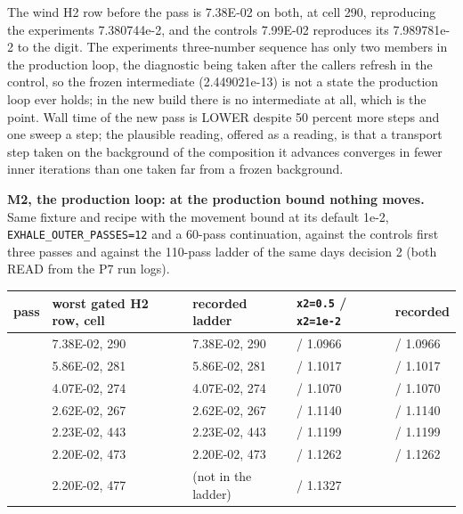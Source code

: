 \documentclass[english,a4paper]{my_memo}
\begin{document}
The wind H2 row before the pass is 7.38E-02 on both, at cell 290, reproducing
the experiment\textquotesingle s 7.380744e-2, and the control\textquotesingle s 7.99E-02 reproduces its
7.989781e-2 to the digit. The experiment\textquotesingle s three-number sequence has only two
members in the production loop, the diagnostic being taken after the caller\textquotesingle s
refresh in the control, so the frozen intermediate (2.449021e-13) is not a state
the production loop ever holds; in the new build there is no intermediate at
all, which is the point. Wall time of the new pass is LOWER despite 50 percent
more steps and one sweep a step; the plausible reading, offered as a reading, is
that a transport step taken on the background of the composition it advances
converges in fewer inner iterations than one taken far from a frozen
background.

\textbf{M2, the production loop: at the production bound nothing moves.} Same
fixture and recipe with the movement bound at its default 1e-2,
\texttt{EXHALE\_OUTER\_PASSES=12} and a 60-pass continuation, against the control\textquotesingle s first
three passes and against the 110-pass ladder of the same day\textquotesingle s decision 2 (both
READ from the P7 run logs).

{\def\LTcaptype{none} %
{\small
\begin{longtable}[]{@{}>{\raggedright\arraybackslash}p{\dimexpr(\linewidth-10\tabcolsep)/5\relax}>{\raggedright\arraybackslash}p{\dimexpr(\linewidth-10\tabcolsep)/5\relax}>{\raggedright\arraybackslash}p{\dimexpr(\linewidth-10\tabcolsep)/5\relax}>{\raggedright\arraybackslash}p{\dimexpr(\linewidth-10\tabcolsep)/5\relax}>{\raggedright\arraybackslash}p{\dimexpr(\linewidth-10\tabcolsep)/5\relax}@{}}
\toprule\noalign{}
pass & worst gated H2 row, cell & recorded ladder & \texttt{x2=0.5} / \texttt{x2=1e-2} & recorded \\
\midrule\noalign{}
\endhead
\bottomrule\noalign{}
\endlastfoot
1 & 7.38E-02, 290 & 7.38E-02, 290 & 1.0726 / 1.0966 & 1.0726 / 1.0966 \\
10 & 5.86E-02, 281 & 5.86E-02, 281 & 1.0755 / 1.1017 & 1.0755 / 1.1017 \\
20 & 4.07E-02, 274 & 4.07E-02, 274 & 1.0796 / 1.1070 & 1.0796 / 1.1070 \\
30 & 2.62E-02, 267 & 2.62E-02, 267 & 1.0827 / 1.1140 & 1.0827 / 1.1140 \\
40 & 2.23E-02, 443 & 2.23E-02, 443 & 1.0871 / 1.1199 & 1.0871 / 1.1199 \\
50 & 2.20E-02, 473 & 2.20E-02, 473 & 1.0917 / 1.1262 & 1.0917 / 1.1262 \\
60 & 2.20E-02, 477 & (not in the ladder) & 1.0953 / 1.1327 & \\
\end{longtable}
}
}
\end{document}
